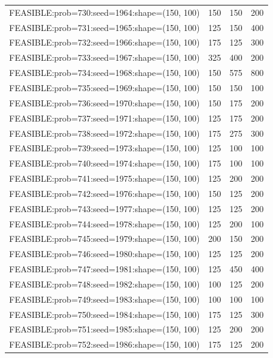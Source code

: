 \begin{longtable}{lccc}
FEASIBLE:prob=730:seed=1964:shape=(150, 100) &      150 &   150 &    200 \\
FEASIBLE:prob=731:seed=1965:shape=(150, 100) &      125 &   150 &    400 \\
FEASIBLE:prob=732:seed=1966:shape=(150, 100) &      175 &   125 &    300 \\
FEASIBLE:prob=733:seed=1967:shape=(150, 100) &      325 &   400 &    200 \\
FEASIBLE:prob=734:seed=1968:shape=(150, 100) &      150 &   575 &    800 \\
FEASIBLE:prob=735:seed=1969:shape=(150, 100) &      150 &   150 &    100 \\
FEASIBLE:prob=736:seed=1970:shape=(150, 100) &      150 &   175 &    200 \\
FEASIBLE:prob=737:seed=1971:shape=(150, 100) &      125 &   175 &    200 \\
FEASIBLE:prob=738:seed=1972:shape=(150, 100) &      175 &   275 &    300 \\
FEASIBLE:prob=739:seed=1973:shape=(150, 100) &      125 &   100 &    100 \\
FEASIBLE:prob=740:seed=1974:shape=(150, 100) &      175 &   100 &    100 \\
FEASIBLE:prob=741:seed=1975:shape=(150, 100) &      125 &   200 &    200 \\
FEASIBLE:prob=742:seed=1976:shape=(150, 100) &      150 &   125 &    200 \\
FEASIBLE:prob=743:seed=1977:shape=(150, 100) &      125 &   125 &    200 \\
FEASIBLE:prob=744:seed=1978:shape=(150, 100) &      125 &   200 &    100 \\
FEASIBLE:prob=745:seed=1979:shape=(150, 100) &      200 &   150 &    200 \\
FEASIBLE:prob=746:seed=1980:shape=(150, 100) &      125 &   125 &    200 \\
FEASIBLE:prob=747:seed=1981:shape=(150, 100) &      125 &   450 &    400 \\
FEASIBLE:prob=748:seed=1982:shape=(150, 100) &      100 &   125 &    200 \\
FEASIBLE:prob=749:seed=1983:shape=(150, 100) &      100 &   100 &    100 \\
FEASIBLE:prob=750:seed=1984:shape=(150, 100) &      175 &   125 &    300 \\
FEASIBLE:prob=751:seed=1985:shape=(150, 100) &      125 &   200 &    200 \\
FEASIBLE:prob=752:seed=1986:shape=(150, 100) &      175 &   125 &    200 \\

\end{longtable}
